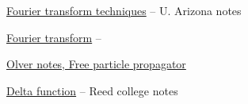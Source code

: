\href{http://math.arizona.edu/~kglasner/math456/fouriertransform.pdf}{Fourier transform techniques} -- U. Arizona notes

\href{https://www.math.utah.edu/~gustafso/s2013/3150/pdeNotes/fourierTransorm-PeterOlver2013.pdf}{Fourier transform} --

\href{http://www.physics.rutgers.edu/~steves/501/Lectures_Final/Lec06_Propagator.pdf}{Olver notes, Free particle propagator}

\href{http://www.reed.edu/physics/faculty/wheeler/documents/Miscellaneous%20Math/Delta%20Functions/Simplified%20Dirac%20Delta.pdf}{Delta function} -- Reed college notes
